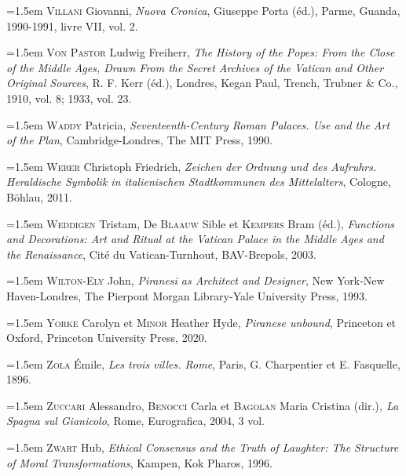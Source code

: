 \documentclass[12pt,twoside,openany]{book}
\newenvironment{PurhBibliography}
  {%
    \par
    \setlength{\parindent}{0pt}%
    \setlength{\leftskip}{0pt}%
  }
  {%
    \par
  }
\begin{document}
\begin{PurhBibliography}
\noindent\hangindent=1.5em \textsc{Villani} Giovanni, \textit{Nuova Cronica}, Giuseppe Porta (éd.), Parme, Guanda, 1990-1991, livre \textsc{VII}, vol. 2.\par
\noindent\hangindent=1.5em \textsc{Von Pastor} Ludwig Freiherr, \textit{The History of the Popes: From the Close of the Middle Ages, Drawn From the Secret Archives of the Vatican and Other Original Sources}, R. F. Kerr (éd.), Londres, Kegan Paul, Trench, Trubner \& Co., 1910, vol. 8; 1933, vol. 23.\par
\noindent\hangindent=1.5em \textsc{Waddy} Patricia, \textit{Seventeenth-Century Roman Palaces. Use and the Art of the Plan}, Cambridge-Londres, The \textsc{MIT} Press, 1990.\par
\noindent\hangindent=1.5em \textsc{Weber} Christoph Friedrich, \textit{Zeichen der Ordnung und des Aufruhrs. Heraldische Symbolik in italienischen Stadtkommunen des Mittelalters}, Cologne, Böhlau, 2011.\par
\noindent\hangindent=1.5em \textsc{Weddigen} Tristam, De \textsc{Blaauw} Sible et \textsc{Kempers} Bram (éd.), \textit{Functions and Decorations: Art and Ritual at the Vatican Palace in the Middle Ages and the Renaissance}, Cité du Vatican-Turnhout, BAV-Brepols, 2003.\par
\noindent\hangindent=1.5em \textsc{Wilton}-\textsc{Ely} John, \textit{Piranesi as Architect and Designer}, New York-New Haven-Londres, The Pierpont Morgan Library-Yale University Press, 1993.\par
\noindent\hangindent=1.5em \textsc{Yorke} Carolyn et \textsc{Minor} Heather Hyde, \textit{Piranese unbound}, Princeton et Oxford, Princeton University Press, 2020.\par
\noindent\hangindent=1.5em \textsc{Zola} Émile, \textit{Les trois villes. Rome}, Paris, G. Charpentier et E. Fasquelle, 1896.\par
\noindent\hangindent=1.5em \textsc{Zuccari} Alessandro, \textsc{Benocci} Carla et \textsc{Bagolan} Maria Cristina (dir.)\textit{, La Spagna sul Gianicolo}, Rome, Eurografica, 2004, 3 vol.\par
\noindent\hangindent=1.5em \textsc{Zwart} Hub, \textit{Ethical Consensus and the Truth of Laughter: The Structure of Moral Transformations}, Kampen, Kok Pharos, 1996.\par
\end{PurhBibliography}
\end{document}

